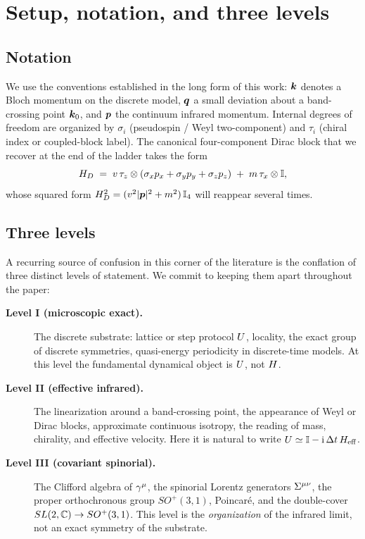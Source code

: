 \section{Setup, notation, and three levels}
\label{p:setup}

\subsection{Notation}
We use the conventions established in the long form of this work:
$\bm{k}$ denotes a Bloch momentum on the discrete model, $\bm{q}$ a small
deviation about a band-crossing point $\bm{k}_{0}$, and $\bm{p}$ the continuum
infrared momentum. Internal degrees of freedom are organized by
$\sigma_{i}$ (pseudospin / Weyl two-component) and $\tau_{i}$ (chiral
index or coupled-block label). The canonical four-component Dirac block
that we recover at the end of the ladder takes the form
\begin{equation}
H_{D} \;=\; v\,\tau_{z} \otimes (\sigma_{x} p_{x} + \sigma_{y} p_{y} + \sigma_{z} p_{z})
            \;+\; m\,\tau_{x}\otimes\mathbb{I} ,
\label{p:eq:HDcanon}
\end{equation}
whose squared form
$H_{D}^{2} = (v^{2}\lvert \bm{p}\rvert^{2} + m^{2})\,\mathbb{I}_{4}$
will reappear several times.

\subsection{Three levels}
A recurring source of confusion in this corner of the literature is the
conflation of three distinct levels of statement. We commit to keeping
them apart throughout the paper:

\begin{description}
\item[\textbf{Level I (microscopic exact).}]
    The discrete substrate: lattice or step protocol $U$, locality, the
    exact group of discrete symmetries, quasi-energy periodicity in
    discrete-time models. At this level the fundamental dynamical object
    is $U$, not $H$.
\item[\textbf{Level II (effective infrared).}]
    The linearization around a band-crossing point, the appearance of
    Weyl or Dirac blocks, approximate continuous isotropy, the reading
    of mass, chirality, and effective velocity. Here it is natural to
    write $U \simeq \mathbb{I} - \mathrm{i}\,\Delta t\,H_{\mathrm{eff}}$.
\item[\textbf{Level III (covariant spinorial).}]
    The Clifford algebra of $\gamma^{\mu}$, the spinorial Lorentz generators
    $\Sigma^{\mu\nu}$, the proper orthochronous group $SO^{+}(3,1)$,
    Poincar\'e, and the double-cover $SL(2,\mathbb{C}) \to SO^{+}(3,1)$. This
    level is the \emph{organization} of the infrared limit, not an exact
    symmetry of the substrate.
\end{description}

